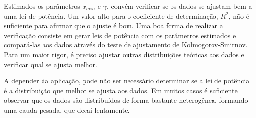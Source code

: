 \documentclass{article}
\begin{document}
Estimados os parâmetros $x_{min}$ e $\gamma$, convém verificar se os dados se ajustam bem a uma lei de potência. Um valor alto para o coeficiente de determinação, $R^2$, não é suficiente para afirmar que o ajuste é bom. Uma boa forma de realizar a verificação consiste em gerar leis de potência com os parâmetros estimados e compará-las aos dados através do teste de ajustamento de Kolmogorov-Smirnov. Para um maior rigor, é preciso ajustar outras distribuições teóricas aos dados e verificar qual se ajusta melhor.

A depender da aplicação, pode não ser necessário determinar se 
a lei de potência é a distribuição que melhor se ajusta aos dados. Em muitos casos é suficiente observar que os dados são distribuídos de forma bastante heterogênea, formando uma cauda pesada, que decai lentamente. 





% 
% 
% 
% 
% 
% 
% 
% 
\end{document}
